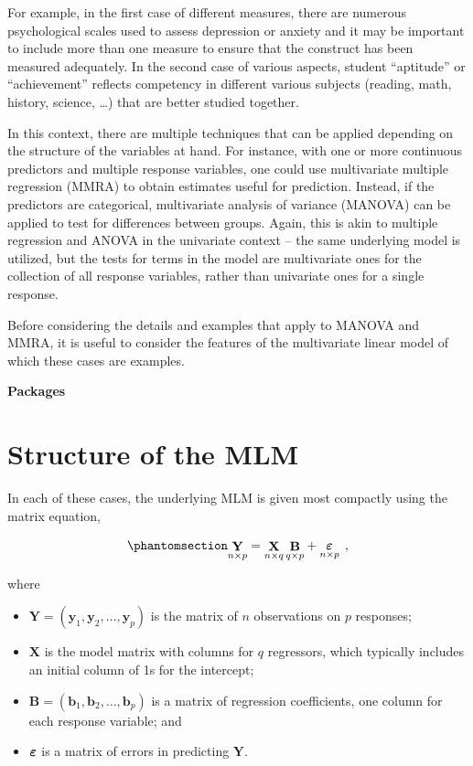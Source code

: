 \documentclass[
  letterpaper,
  10pt,
  krantz2]{krantz}
\providecommand{\tightlist}{%
  \setlength{\itemsep}{0pt}\setlength{\parskip}{0pt}}\usepackage{longtable,booktabs,array}
\begin{document}
{For example, in the first case of different measures, there are numerous
psychological scales used to assess depression or anxiety and it may be
important to include more than one measure to ensure that the construct
has been measured adequately. In the second case of various aspects,
student ``aptitude'' or ``achievement'' reflects competency in different
various subjects (reading, math, history, science, \ldots) that are
better studied together.

In this context, there are multiple techniques that can be applied
depending on the structure of the variables at hand. For instance, with
one or more continuous predictors and multiple response variables, one
could use multivariate multiple regression (MMRA) to obtain estimates
useful for prediction. Instead, if the predictors are categorical,
multivariate analysis of variance (MANOVA) can be applied to test for
differences between groups. Again, this is akin to multiple regression
and ANOVA in the univariate context -- the same underlying model is
utilized, but the tests for terms in the model are multivariate ones for
the collection of all response variables, rather than univariate ones
for a single response.

Before considering the details and examples that apply to MANOVA and
MMRA, it is useful to consider the features of the multivariate linear
model of which these cases are examples.

\textbf{Packages}

\section{Structure of the MLM}\label{structure-of-the-mlm}

In each of these cases, the underlying MLM is given most compactly using
the matrix equation,

\begin{equation}\phantomsection\label{eq-mlm}{
\mathord{\mathop{\mathbf{Y}}\limits_{n \times p}} = 
\mathord{\mathop{\mathbf{X}}\limits_{n \times q}} \, \mathord{\mathop{\mathbf{B}}\limits_{q \times p}} + \mathord{\mathop{\mathbf{\boldsymbol{\Large\varepsilon}}}\limits_{n \times p}} \:\: ,
}\end{equation}

where

\begin{itemize}
\tightlist
\item
  \(\mathbf{Y} = (\mathbf{y}_1 , \mathbf{y}_2, \dots , \mathbf{y}_p )\)
  is the matrix of \(n\) observations on \(p\) responses;
\item
  \(\mathbf{X}\) is the model matrix with columns for \(q\) regressors,
  which typically includes an initial column of 1s for the intercept;
\item
  \(\mathbf{B} = ( \mathbf{b}_1 , \mathbf{b}_2 , \dots , \mathbf{b}_p )\)
  is a matrix of regression coefficients, one column for each response
  variable; and
\item
  \(\boldsymbol{\Large\varepsilon}\) is a matrix of errors in predicting
  \(\mathbf{Y}\).
\end{itemize}

}
\end{document}

